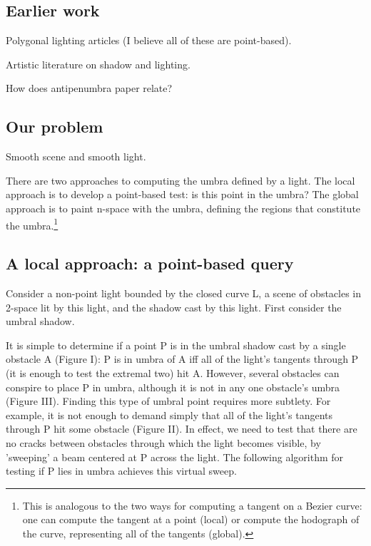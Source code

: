 \documentclass[12pt]{article}
\begin{document}
\subsection{Earlier work}

Polygonal lighting articles (I believe all of these are point-based).

Artistic literature on shadow and lighting.

How does antipenumbra paper relate?

\subsection{Our problem}

Smooth scene and smooth light.

There are two approaches to computing the umbra defined by a light.
The local approach is to develop a point-based test: is this point in the umbra?
The global approach is to paint n-space with the umbra, defining the regions
that constitute the umbra.\footnote{This is analogous to the 
	two ways for computing a tangent on a Bezier curve:
	one can compute the tangent at a point (local)
	or compute the hodograph of the curve, representing all of the tangents (global).}

\subsection{A local approach: a point-based query}
\label{sec:local}

Consider a non-point light bounded by the closed curve L,
a scene of obstacles in 2-space lit by this light, and the shadow cast by this light.
First consider the umbral shadow.

It is simple to determine if a point P is in the umbral shadow cast by a 
single obstacle A (Figure I):
P is in umbra of A iff all of the light's tangents through P (it is enough to test
the extremal two) hit A.
However, several obstacles can conspire to place P in umbra, although it is not
in any one obstacle's umbra (Figure III).
Finding this type of umbral point requires more subtlety.
For example, it is not enough to demand simply that all of the light's tangents through P
hit some obstacle (Figure II).
In effect, we need to test that there are no cracks between obstacles through which
the light becomes visible, by 'sweeping' a beam centered at P across the light.
The following algorithm for testing if P lies in umbra achieves this virtual sweep.
\end{document}
